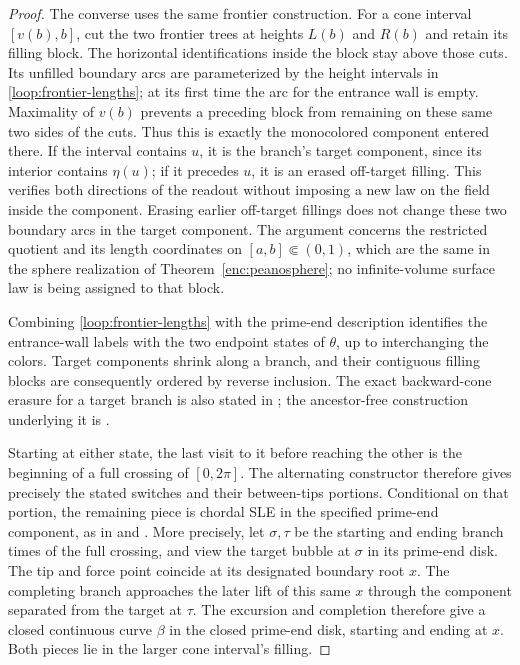 \documentclass[11pt]{article}
\numberwithin{equation}{section}
\theoremstyle{definition}
\theoremstyle{remark}
\newcommand{\1}{\mathbf 1}
\begin{document}
\begin{proof}
The converse uses the same frontier construction.  For a cone interval
$[v(b),b]$, cut the two frontier trees at heights $L(b)$ and $R(b)$
and retain its filling block.  The horizontal identifications inside
the block stay above those cuts.  Its unfilled boundary arcs are
parameterized by the height intervals in
\eqref{loop:frontier-lengths}; at its first time the arc for the
entrance wall is empty.  Maximality of $v(b)$ prevents a preceding
block from remaining on these same two sides of the cuts.  Thus this
is exactly the monocolored component entered there.  If the interval
contains $u$, it is the branch's target component, since its interior
contains $\eta(u)$; if it precedes $u$, it is an erased off-target
filling.  This verifies both directions of the readout without imposing
a new law on the field inside the component.  Erasing earlier
off-target fillings does not change these two boundary arcs in the
target component.  The argument concerns the restricted quotient and
its length coordinates on $[a,b]\Subset(0,1)$, which are the same
in the sphere realization of Theorem~\ref{enc:peanosphere}; no
infinite-volume surface law is being assigned to that block.

Combining \eqref{loop:frontier-lengths} with the prime-end description
identifies the entrance-wall labels with the two endpoint states of
$\theta$, up to interchanging the colors.  Target components shrink
along a branch, and their contiguous filling blocks are consequently
ordered by reverse inclusion.  The exact backward-cone erasure for a
target branch is also stated in
\cite[Section~4.2 and Definition~4.14]{AruHoldenPowellSunCritical};
the ancestor-free construction underlying it is
\cite[Proposition~1.13 and Lemma~10.4]{DMSMating}.

Starting at either state, the last visit to it before reaching the other
is the beginning of a full crossing of $[0,2\pi]$.  The alternating
constructor therefore gives precisely the stated switches and their
between-tips portions.  Conditional on that portion, the remaining
piece is chordal SLE in the specified prime-end component, as in
\cite[Section~2.1.6]{AruHoldenPowellSunCritical} and
\cite[Section~2.3.2]{GwynneMillerQianCLE}.  More precisely, let
$\sigma,\tau$ be the starting and ending branch times of the full
crossing, and view the target bubble at $\sigma$ in its prime-end disk.
The tip and force point coincide at its designated boundary root $x$.
The completing branch approaches the later lift of this same $x$
through the component separated from the target at $\tau$.  The
excursion and completion therefore give a closed continuous curve
$\beta$ in the closed prime-end disk, starting and ending at $x$.
Both pieces lie in the larger cone interval's filling.


\end{proof}
\end{document}

